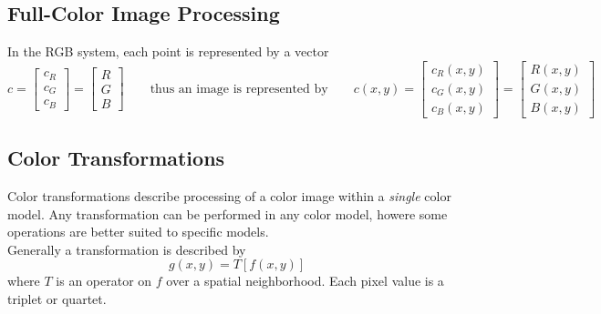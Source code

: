 \subsection{Full-Color Image Processing }
In the RGB system, each point is represented by a vector
\begin{equation}
	c = \left[\begin{array}{l}
		c_R \\ c_G \\ c_B
	\end{array} \right]
	= \left[\begin{array}{l}
		R \\ G \\ B
	\end{array} \right]
	\qquad \text{thus an image is represented by} \qquad
	c(x,y) = \left[\begin{array}{l}
		c_R(x,y) \\ c_G(x,y) \\ c_B(x,y)
	\end{array} \right]
	= \left[\begin{array}{l}
		R(x,y) \\ G(x,y) \\ B(x,y)
	\end{array} \right]	
\end{equation}

\subsection{Color Transformations }
Color transformations describe processing of a color image within a \textit{single} color model. Any transformation can be performed in any color model, howere some operations are better suited to specific models. \\

Generally a transformation is described by 
\begin{equation}
	g(x,y) = T\left[f(x,y)\right]
\end{equation}
where $T$ is an operator on $f$ over a spatial neighborhood. Each pixel value is a triplet or quartet. \\

